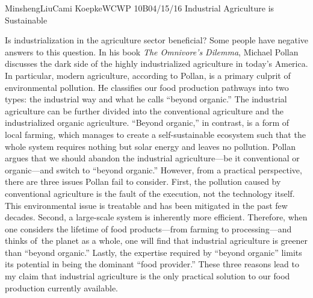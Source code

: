 \documentclass[12pt,letterpaper]{article}
\begin{document}
\begin{mla}{Minsheng}{Liu}{Cami Koepke}{WCWP 10B}{04/15/16}
  {Industrial Agriculture is Sustainable}

Is industrialization in the agriculture sector beneficial? Some people
have negative answers to this question. In his book \emph{The Omnivore's
Dilemma}, Michael Pollan discusses the dark side of the highly
industrialized agriculture in today's America. In particular, modern
agriculture, according to Pollan, is a primary culprit of environmental
pollution. He classifies our food production pathways into two types:
the industrial way and what he calls ``beyond organic.'' The industrial
agriculture can be further divided into the conventional agriculture and
the industrialized organic agriculture. ``Beyond organic,'' in contrast,
is a form of local farming, which manages to create a self-sustainable
ecosystem such that the whole system requires nothing but solar energy
and leaves no pollution. Pollan argues that we should abandon the
industrial agriculture---be it conventional or organic---and switch to
``beyond organic.'' However, from a practical perspective, there are
three issues Pollan fail to consider. First, the pollution caused by
conventional agriculture is the fault of the execution, not the
technology itself. This environmental issue is treatable and has been
mitigated in the past few decades. Second, a large-scale system is
inherently more efficient. Therefore, when one considers the lifetime of
food products---from farming to processing---and thinks of~the planet as
a whole, one will find that industrial agriculture is greener than
``beyond organic.'' Lastly, the expertise required by ``beyond organic''
limits its potential in being the dominant ``food provider.'' These
three reasons lead to my claim that industrial agriculture is the only
practical solution to our food production currently available.


\end{mla}
\end{document}
